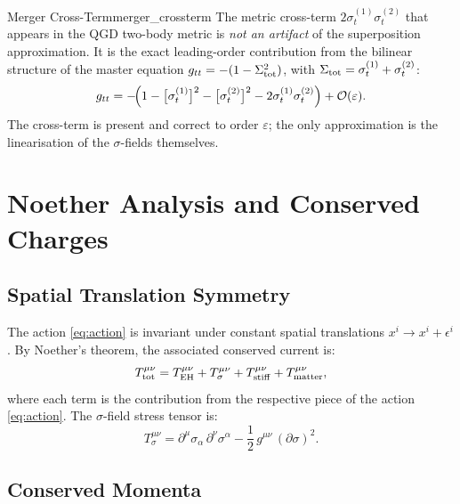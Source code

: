 \documentclass[11pt,a4paper]{article}
\theoremstyle{definition}
\theoremstyle{remark}
\newcommand{\Sigt}{\Sigma_{\rm tot}}
\newcommand{\crossterm}[2]{\sigma_{t}^{(#1)}\sigma_{t}^{(#2)}}
\newcommand{\sig}[2]{\sigma_{#1}^{(#2)}}
\begin{document}
	\begin{corollary}{Merger Cross-Term}{merger_crossterm}
		The metric cross-term $2\crossterm{1}{2}$ that appears in the QGD
		two-body metric is \emph{not an artifact} of the superposition
		approximation.  It is the exact leading-order contribution from the
		bilinear structure of the master equation $g_{tt}=-(1-\Sigt^2)$,
		with $\Sigt=\sig{t}{1}+\sig{t}{2}$:
		\begin{equation}
			g_{tt}
			= -\!\Bigl(1 - \bigl[\sig{t}{1}\bigr]^2 - \bigl[\sig{t}{2}\bigr]^2
			- 2\crossterm{1}{2}\Bigr)
			+ \mathcal{O}(\varepsilon).
			\label{eq:gtt_exact}
		\end{equation}
		The cross-term is present and correct to order $\varepsilon$; the only
		approximation is the linearisation of the $\sigma$-fields themselves.
	\end{corollary}
	
	\section{Noether Analysis and Conserved Charges}
	\label{sec:noether}
	
	\subsection{Spatial Translation Symmetry}
	
	The action \eqref{eq:action} is invariant under constant spatial
	translations $x^i\to x^i+\epsilon^i$.  By Noether's theorem, the
	associated conserved current is:
	\begin{equation}
		T^{\mu\nu}_{\rm tot}
		= T^{\mu\nu}_{\rm EH}
		+ T^{\mu\nu}_\sigma
		+ T^{\mu\nu}_{\rm stiff}
		+ T^{\mu\nu}_{\rm matter},
		\label{eq:T_total}
	\end{equation}
	where each term is the contribution from the respective piece of the
	action \eqref{eq:action}.  The $\sigma$-field stress tensor is:
	\begin{equation}
		T^{\mu\nu}_\sigma
		= \partial^\mu\sigma_\alpha\,\partial^\nu\sigma^\alpha
		- \frac{1}{2}\,g^{\mu\nu}\,(\partial\sigma)^2.
		\label{eq:T_sigma}
	\end{equation}
	
	\subsection{Conserved Momenta}
	
\end{document}
